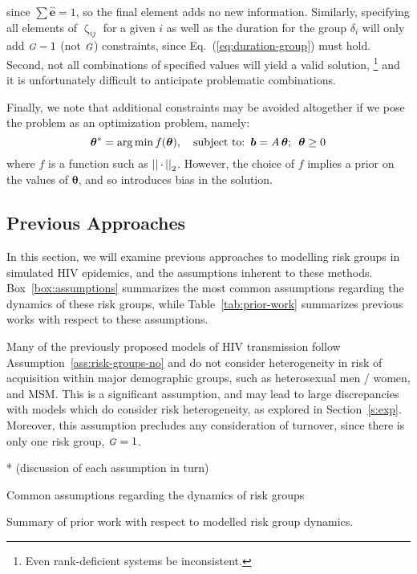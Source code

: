 \documentclass[10pt]{article}
\numberwithin{equation}{section}
\renewcommand{\zeta}{\upzeta}
\newcommand{\G}{{\mbox{\footnotesize{\textit{G}}}}}
\newcommand{\eq}[1]{Eq.~(\ref{#1})}
\begin{document}
since $\sum \bm{\hat{e}} = 1$, so the final element adds no new information.
Similarly, specifying all elements of $\zeta_{ij}$ for a given $i$
as well as the duration for the group $\delta_i$
will only add $\G-1$ (not $\G$) constraints,
since \eq{eq:duration-group} must hold.
Second, not all combinations of specified values will yield a valid solution,%
\footnote{Even rank-deficient systems be inconsistent.}
and it is unfortunately difficult to anticipate problematic combinations.
\par
Finally, we note that additional constraints may be avoided altogether if we pose the problem
as an optimization problem, namely:
\begin{equation}\label{eq:system-optimize}
\bm{\theta}^{*} = {\arg \min}
  \thinspace f(\bm{\theta}),
  \quad \textrm{subject to:}
  \enspace\bm{b} = A\thinspace\bm{\theta};
  \enspace\bm{\theta} \ge 0
\end{equation}
where $f$ is a function such as ${\left|\left| \thinspace\cdot\thinspace \right|\right|}_2$.
However, the choice of $f$ implies a prior on the values of $\bm{\theta}$,
and so introduces bias in the solution.
\subsection{Previous Approaches}
In this section, we will examine previous approaches to modelling
risk groups in simulated HIV epidemics,
and the assumptions inherent to these methods.
Box~\ref{box:assumptions} summarizes
the most common assumptions regarding the dynamics of these risk groups,
while Table~\ref{tab:prior-work} summarizes previous works
with respect to these assumptions.
\par
Many of the previously proposed models of HIV transmission
follow Assumption~\ref{ass:risk-groups-no} and do not consider heterogeneity
in risk of acquisition within major demographic groups,
such as heterosexual men / women, and MSM.
This is a significant assumption,
and may lead to large discrepancies with models which do consider risk heterogeneity,
as explored in Section~\ref{s:exp}.
Moreover, this assumption precludes any consideration of turnover,
since there is only one risk group, $\G = 1$.
\par
* (discussion of each assumption in turn)
\begin{floatbox}
  \caption{Common assumptions regarding the dynamics of risk groups}
  \label{box:assumptions}
  
\end{floatbox}
\begin{table}
  \centering
  \caption{Summary of prior work with respect to modelled risk group dynamics.}
  \label{tab:prior-work}
  
\end{table}
\clearpage
\end{document}
